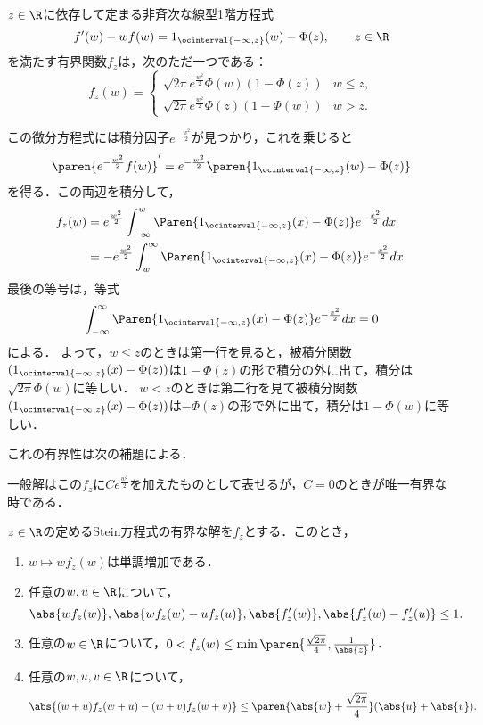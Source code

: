 \documentclass[uplatex,dvipdfmx]{jsreport}
\begin{document}
\begin{lemma}[Stein方程式の解]
    $z\in\R$に依存して定まる非斉次な線型1階方程式
    \[f'(w)-wf(w)=1_{\ocinterval{-\infty,z}}(w)-\Phi(z),\qquad z\in\R\]
    を満たす有界関数$f_z$は，次のただ一つである：
    \[f_z(w)=\begin{cases}
        \sqrt{2\pi}e^{\frac{w^2}{2}}\Phi(w)(1-\Phi(z))&w\le z,\\
        \sqrt{2\pi}e^{\frac{w^2}{2}}\Phi(z)(1-\Phi(w))&w>z.
    \end{cases}\]
\end{lemma}
\begin{Proof}
    この微分方程式には積分因子$e^{-\frac{w^2}{2}}$が見つかり，これを乗じると
    \[\paren{e^{-\frac{w^2}{2}}f(w)}'=e^{-\frac{w^2}{2}}\paren{1_{\ocinterval{-\infty,z}}(w)-\Phi(z)}\]
    を得る．この両辺を積分して，
    \begin{align*}
        f_z(w)&=e^{\frac{w^2}{2}}\int^w_{-\infty}\Paren{1_{\ocinterval{-\infty,z}}(x)-\Phi(z)}e^{-\frac{x^2}{2}}dx\\
        &=-e^{\frac{w^2}{2}}\int^\infty_w\Paren{1_{\ocinterval{-\infty,z}}(x)-\Phi(z)}e^{-\frac{x^2}{2}}dx.
    \end{align*}
    最後の等号は，等式
    \[\int^\infty_{-\infty}\Paren{1_{\ocinterval{-\infty,z}}(x)-\Phi(z)}e^{-\frac{x^2}{2}}dx=0\]
    による．
    よって，$w\le z$のときは第一行を見ると，被積分関数$(1_{\ocinterval{-\infty,z}}(x)-\Phi(z))$は$1-\Phi(z)$の形で積分の外に出て，積分は$\sqrt{2\pi}\Phi(w)$に等しい．
    $w<z$のときは第二行を見て被積分関数$(1_{\ocinterval{-\infty,z}}(x)-\Phi(z))$は$-\Phi(z)$の形で外に出て，積分は$1-\Phi(w)$に等しい．

    これの有界性は次の補題による．

    一般解はこの$f_z$に$Ce^{\frac{w^2}{2}}$を加えたものとして表せるが，$C=0$のときが唯一有界な時である．
\end{Proof}

\begin{lemma}
    $z\in\R$の定めるStein方程式の有界な解を$f_z$とする．このとき，
    \begin{enumerate}
        \item $w\mapsto wf_z(w)$は単調増加である．
        \item 任意の$w,u\in\R$について，\[\abs{wf_z(w)},\abs{wf_z(w)-uf_z(u)},\abs{f'_z(w)},\abs{f'_z(w)-f'_z(u)}\le1.\]
        \item 任意の$w\in\R$について，$0<f_z(w)\le\min\paren{\frac{\sqrt{2\pi}}{4},\frac{1}{\abs{z}}}$．
        \item 任意の$w,u,v\in\R$について，
        \[\abs{(w+u)f_z(w+u)-(w+v)f_z(w+v)}\le\paren{\abs{w}+\frac{\sqrt{2\pi}}{4}}(\abs{u}+\abs{v}).\]
    \end{enumerate}
\end{lemma}
\end{document}

